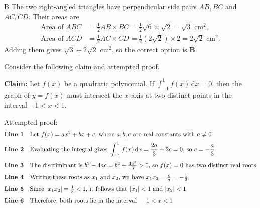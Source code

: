 \documentclass[11pt,a4paper]{article}
\begin{document}
\begin{enumerate}[label=\textbf{\arabic*.},leftmargin=*,itemsep=0pt,start=2]
\begin{djsSolution}{B}
The two right-angled triangles have perpendicular side pairs $AB,BC$ and $AC,CD$. Their areas are
\[
\begin{aligned}
\text{Area of }ABC&=\frac12 AB\times BC
=\frac12\sqrt{6}\times\sqrt{2}=\sqrt{3}\text{ cm}^2,\\
\text{Area of }ACD&=\frac12 AC\times CD
=\frac12(2\sqrt{2})\times2=2\sqrt{2}\text{ cm}^2.
\end{aligned}
\]
Adding them gives $\sqrt{3}+2\sqrt{2}\text{ cm}^2$, so the correct option is \textbf{B}.
\end{djsSolution}
\end{enumerate}
\clearpage
\thispagestyle{djssolutions}
\vspace*{8pt}
\begin{enumerate}[label=\textbf{\arabic*.},leftmargin=*,itemsep=0pt,start=3]
Consider the following claim and attempted proof.

\begin{center}
\begin{minipage}{0.82\linewidth}
\centering
\textbf{Claim:} Let $f(x)$ be a quadratic polynomial. If $\displaystyle\int_{-1}^{1} f(x)\,\mathrm{d}x = 0$, then the graph of $y = f(x)$ must intersect the $x$-axis at two distinct points in the interval $-1 < x < 1$.
\end{minipage}
\end{center}
Attempted proof:
\[
\begin{array}{@{}rl@{}}
\textbf{Line 1} & \text{Let } f(x) = ax^2 + bx + c\text{, where } a, b, c \text{ are real constants with } a \ne 0 \\[5pt]
\textbf{Line 2} & \text{Evaluating the integral gives } \displaystyle\int_{-1}^{1} f(x)\,\mathrm{d}x = \frac{2a}{3} + 2c = 0\text{, so } c = -\frac{a}{3} \\[12pt]
\textbf{Line 3} & \text{The discriminant is } b^2-4ac=b^2+\frac{4a^2}{3}>0\text{, so }f(x)=0\text{ has two distinct real roots} \\[7pt]
\textbf{Line 4} & \text{Writing these roots as }x_1\text{ and }x_2\text{, we have }x_1x_2=\frac{c}{a}=-\frac{1}{3} \\[7pt]
\textbf{Line 5} & \text{Since } |x_1 x_2| = \frac{1}{3} < 1\text{, it follows that } |x_1| < 1 \text{ and } |x_2| < 1 \\[7pt]
\textbf{Line 6} & \text{Therefore, both roots lie in the interval } -1 < x < 1\\[5pt]
\end{array}
\]


\end{enumerate}
\end{document}
